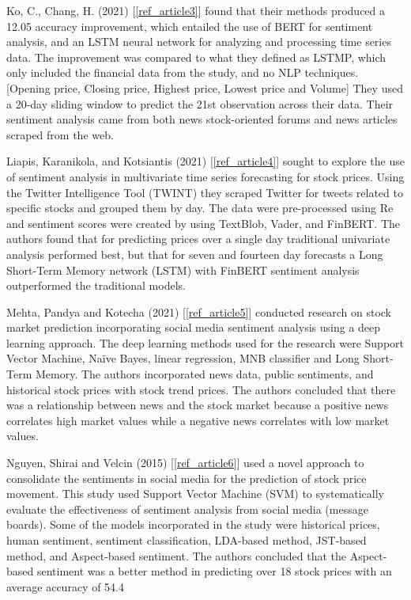 \documentclass{llncs}
\begin{document}
Ko, C., Chang, H. (2021) [\ref{ref_article3}] found that their methods produced a 12.05 accuracy improvement, which entailed the use of BERT for sentiment analysis, and an LSTM neural network for analyzing and processing time series data. The improvement was compared to what they defined as LSTMP, which only included the financial data from the study, and no NLP techniques. [Opening price, Closing price, Highest price, Lowest price and Volume] They used a 20-day sliding window to predict the 21st observation across their data. Their sentiment analysis came from both news stock-oriented forums and news articles scraped from the web.

Liapis, Karanikola, and Kotsiantis (2021) [\ref{ref_article4}] sought to explore the use of sentiment analysis in multivariate time series forecasting for stock prices. Using the Twitter Intelligence Tool (TWINT) they scraped Twitter for tweets related to specific stocks and grouped them by day. The data were pre-processed using Re and sentiment scores were created by using TextBlob, Vader, and FinBERT. The authors found that for predicting prices over a single day traditional univariate analysis performed best, but that for seven and fourteen day forecasts a Long Short-Term Memory network (LSTM) with FinBERT sentiment analysis outperformed the traditional models.

Mehta, Pandya and Kotecha (2021) [\ref{ref_article5}] conducted research on stock market prediction incorporating social media sentiment analysis using a deep learning approach. The deep learning methods used for the research were Support Vector Machine, Naïve Bayes, linear regression, MNB classifier and Long Short-Term Memory. The authors incorporated news data, public sentiments, and historical stock prices with stock trend prices. The authors concluded that there was a relationship between news and the stock market because a positive news correlates high market values while a negative news correlates with low market values.

Nguyen, Shirai and Velcin (2015) [\ref{ref_article6}] used a novel approach to consolidate the sentiments in social media for the prediction of stock price movement. This study used Support Vector Machine (SVM) to systematically evaluate the effectiveness of sentiment analysis from social media (message boards). Some of the models incorporated in the study were historical prices, human sentiment, sentiment classification, LDA-based method, JST-based method, and Aspect-based sentiment.  The authors concluded that the Aspect-based sentiment was a better method in predicting over 18 stock prices with an average accuracy of 54.4%
\end{document}
